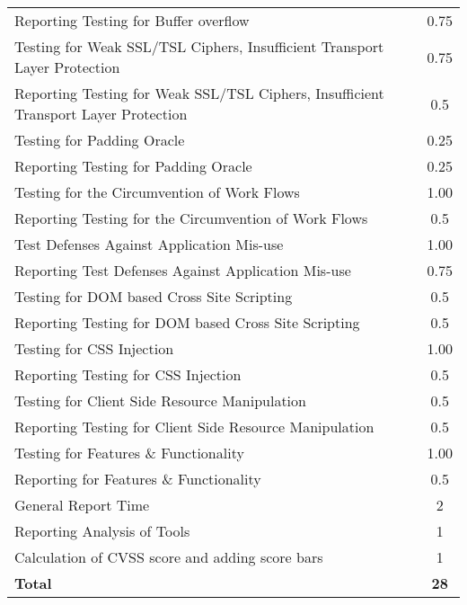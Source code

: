 \begin{table}[H]
\begin{tabular*}{\textwidth}{@{\extracolsep{\fill}} l c@{\extracolsep{0pt}} }
Reporting Testing for Buffer overflow       & 0.75 \\
Testing for Weak SSL/TSL Ciphers, Insufficient Transport Layer Protection & 0.75 \\
Reporting Testing for Weak SSL/TSL Ciphers, Insufficient Transport Layer Protection & 0.5 \\
Testing for Padding Oracle					& 0.25 \\
Reporting Testing for Padding Oracle 		& 0.25 \\
Testing for the Circumvention of Work Flows	& 1.00 \\
Reporting Testing for the Circumvention of Work Flows & 0.5 \\
Test Defenses Against Application Mis-use	& 1.00 \\
Reporting Test Defenses Against Application Mis-use & 0.75 \\
Testing for DOM based Cross Site Scripting	& 0.5 \\
Reporting Testing for DOM based Cross Site Scripting & 0.5 \\
Testing for CSS Injection					& 1.00 \\
Reporting Testing for CSS Injection         & 0.5 \\
Testing for Client Side Resource Manipulation & 0.5 \\
Reporting Testing for Client Side Resource Manipulation & 0.5 \\
Testing for Features \& Functionality       & 1.00 \\
Reporting for Features \& Functionality     & 0.5 \\
General Report Time							& 2 \\
Reporting Analysis of Tools                 & 1 \\
Calculation of CVSS score and adding score bars & 1 \\ \hline\hline
\textbf{Total}								& \textbf{28}
\end{tabular*}
\end{table}
\clearpage